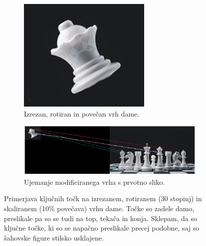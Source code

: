 \documentclass[a4paper,11pt]{article}
\begin{document}
\begin{figure}[hb]
\centering
	\begin{subfigure}[t]{0.48\textwidth}
		\centering
		\includegraphics[width=\textwidth]{images/chess_queen.jpg}
		\caption{Izrezan, rotiran in povečan vrh dame.}
		\label{img:chess_queen}
	\end{subfigure}
	\begin{subfigure}[t]{1\textwidth}
		\centering
			\includegraphics[width=1\textwidth]{images/match_rotate_scale.png}
		\caption{Ujemanje modificiranega vrha s prvotno sliko.}
		\label{img:chess_queen_match}
	\end{subfigure}

	\caption{Primerjava ključnih točk na izrezanem, rotiranem (30 stopinj) in skaliranem (10\% povečava) vrhu dame. Točke so zadele damo, preslikale pa so se tudi na top, tekača in konja. Sklepam, da so ključne točke, ki so se napačno preslikale precej podobne, saj so šahovske figure stilsko usklajene.}
	\label{img:match_rotate_scale}
\end{figure}
\end{document}
